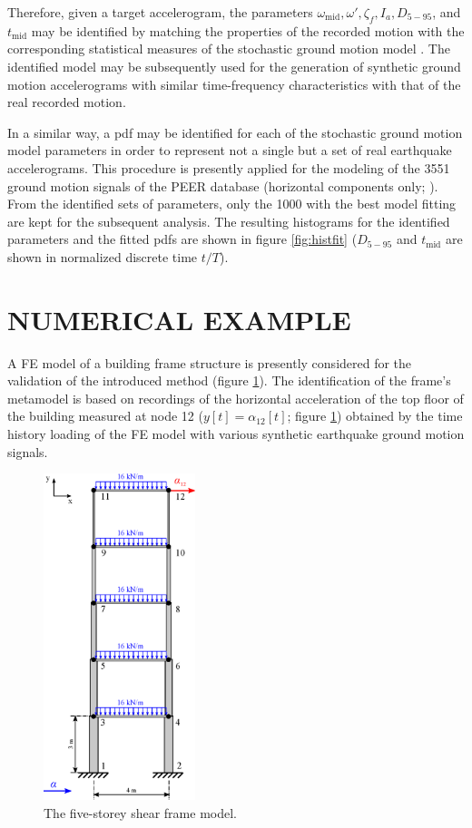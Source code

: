 \documentclass[12pt,a4paper,twocolumn,fleqn]{narms}
\begin{document}
Therefore, given a target accelerogram, the parameters $\omega_{\text{mid}}, \omega', \zeta_f, I_a, D_{5-95}$, and $t_{\text{mid}}$ may be identified by matching the properties of the recorded motion with the corresponding statistical measures of the stochastic ground motion model \cite{Rezaeian-Kiureghian2010}. The identified model may be subsequently used for the generation of synthetic ground motion accelerograms with similar time-frequency characteristics with that of the real recorded motion. 


In a similar way, a pdf may be identified for each of the stochastic ground motion model parameters in order to represent not a single but a set of real earthquake accelerograms. This procedure is presently applied for the modeling of the 3551 ground motion signals of the PEER database (horizontal components only; ). From the identified sets of parameters, only the 1000 with the best model fitting are kept for the subsequent analysis. The resulting histograms for the identified parameters and the fitted pdfs are shown in figure \ref{fig:histfit} ($D_{5-95}$ and $t_{\text{mid}}$ are shown in normalized discrete time $t/T$). 


\section{NUMERICAL EXAMPLE}

A FE model of a building frame structure is presently considered for the validation of the introduced method (figure \ref{fig:ShearFrame}). The identification of the frame's metamodel is based on recordings of the horizontal acceleration of the top floor of the building measured at node 12 ($y[t] =\alpha_{12}[t] $; figure \ref{fig:ShearFrame}) obtained by the time history loading of the FE model with various synthetic earthquake ground motion signals. 

\begin{figure}[t!]
\centering
\includegraphics[height = 270pt]{figs/ShearFrame5storey.eps}
\caption{The five-storey shear frame model.}\label{fig:ShearFrame}
\end{figure}
\end{document}
